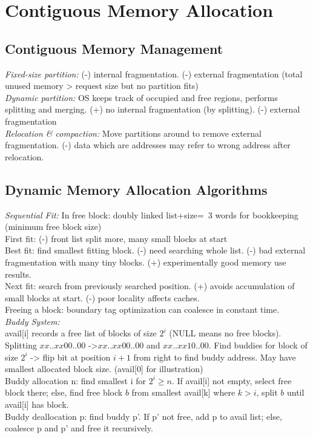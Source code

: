 \section{Contiguous Memory Allocation}
\subsection*{Contiguous Memory Management}
\emph{Fixed-size partition:} (-) internal fragmentation. (-) external fragmentation (total unused memory > request size but no partition fits)\\
\emph{Dynamic partition:} OS keeps track of occupied and free regions, performs splitting and merging. (+) no internal fragmentation (by splitting). (-) external fragmentation\\
\emph{Relocation \& compaction:} Move partitions around to remove external fragmentation. (-) data which are addresses may refer to wrong address after relocation.

\subsection*{Dynamic Memory Allocation Algorithms}
\emph{Sequential Fit:} In free block: doubly linked list+size=~3 words for bookkeeping (minimum free block size)\\
First fit: (-) front list split more, many small blocks at start\\
Best fit: find smallest fitting block. (-) need searching whole list. (-) bad external fragmentation with many tiny blocks. (+) experimentally good memory use results.\\
Next fit: search from previously searched position. (+) avoids accumulation of small blocks at start. (-) poor locality affects caches.\\
Freeing a block: boundary tag optimization can coalesce in constant time.\\
\emph{Buddy System:}\\
avail[i] records a free list of blocks of size $2^i$ (NULL means no free blocks). Splitting $xx..xx00..00$ ->$xx..xx00..00$ and $xx..xx10..00$. Find buddies for block of size $2^i$ -> flip bit at position $i+1$ from right to find buddy address. May have smallest allocated block size. (avail[0] for illustration)\\
Buddy allocation n: find smallest i for $2^i \geqslant n$. If avail[i] not empty, select free block there; else, find free block $b$ from smallest avail[k] where $k>i$, split $b$ until avail[i] has block.\\
Buddy deallocation p: find buddy p'. If p' not free, add p to avail list; else, coalesce p and p' and free it recursively.
